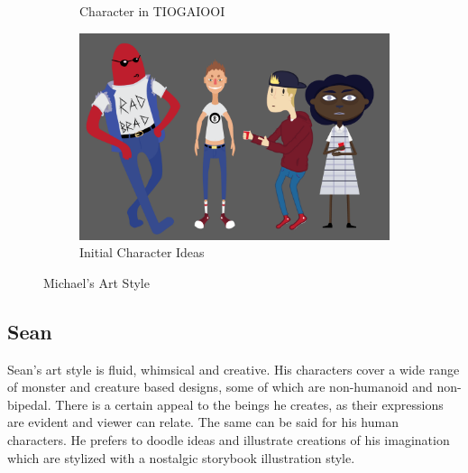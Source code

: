 \begin{figure}[H]
\begin{subfigure}{.5\textwidth}
    \caption{Character in TIOGAIOOI}
    \label{fig:m3}
  \end{subfigure}
  \begin{subfigure}{.45\textwidth}
    \centering
    \includegraphics[width=.9\linewidth]{images/ref_MICHAEL04}
    \caption{Initial Character Ideas}
    \label{fig:m4}
  \end{subfigure}
  \caption{Michael's Art Style}
  \label{fig:mstyle}
\end{figure}

\clearpage
\subsection{Sean}
Sean's art style is fluid, whimsical and creative. His characters cover a wide range of monster and creature based designs, some of which are non-humanoid and non-bipedal. There is a certain appeal to the beings he creates, as their expressions are evident and viewer can relate. The same can be said for his human characters. He prefers to doodle ideas and illustrate creations of his imagination which are stylized with a nostalgic storybook illustration style.

